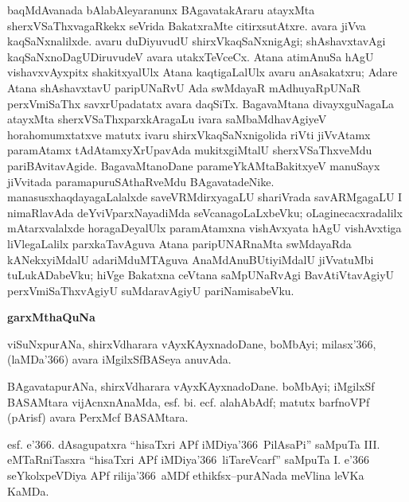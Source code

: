 baqMdAvanada bAlabAleyaranunx BAgavatakAraru atayxMta sherxVSaThxvagaRkekx seVrida BakatxraMte citirxsutAtxre. avara jiVva kaqSaNxnalilxde. avaru duDiyuvudU shirxVkaqSaNxnigAgi; shAshavxtavAgi kaqSaNxnoDagUDiruvudeV avara utakxTeVceCx. Atana atimAnuSa hAgU vishavxvAyxpitx shakitxyalUlx Atana kaqtigaLalUlx avaru anAsakatxru; Adare Atana shAshavxtavU paripUNaRvU Ada swMdayaR mAdhuyaRpUNaR perxVmiSaThx savxrUpadatatx avara daqSiTx. BagavaMtana divayxguNagaLa atayxMta sherxVSaThxparxkAragaLu ivara saMbaMdhavAgiyeV hora\break\-homumxtatxve matutx ivaru shirxVkaqSaNxnigolida riVti jiVvAtamx paramAtamx tAdAtamxyX\-rUpa\-vAda mukitxgiMtalU sherxVSaThxveMdu pariBAvitavAgide. BagavaMtanoDane parameYkAMta\break BakitxyeV manuSayx jiVvitada paramapuruSAthaRveMdu BAgavatadeNike. manasusx\break haqdayagaLalalxde saveVRMdirxyagaLU shariVrada savARMgagaLU I nimaRlavAda deYviV\-parxNayadiMda seVcanagoLaLxbeVku; oLaginecacxradalilx mAtarxvalalxde horagaDeyalUlx para\-mAtamxna vishAvxyata hAgU vishAvxtiga liVlegaLalilx parxkaTavAguva Atana paripUNARnaMta swMdayaRda kANekxyiMdalU adariMduMTAguva AnaMdAnuBUtiyiMdalU jiVvatuMbi tuLukADabeVku; hiVge Bakatxna ceVtana saMpUNaRvAgi BavAtiVtavAgiyU perxVmiSaThxvAgiyU suMdaravAgiyU pariNamisabeVku. 

\theendnotes

\vskip 1cm

\begin{center}
{\bf garxMthaQuNa}
\end{center}

\smallskip
viSuNxpurANa, shirxVdharara vAyxKAyxnadoDane, boMbAyi; milasx\char'366, (laMDa\char'366) avara iMgilxSfBASeya anuvAda.

\smallskip
BAgavatapurANa, shirxVdharara vAyxKAyxnadoDane. boMbAyi; iMgilxSf BASAMtara vijAcnxnAnaMda, esf. bi. ecf. alahAbAdf; matutx barfnoVPf (pArisf) avara PerxMcf BASAMtara.

\smallskip
esf. e\char'366. dAsagupatxra ``hisaTxri APf iMDiya\char'366\ PilAsaPi'' saMpuTa {\rm III.} eMTaRniTasxra ``hisaTxri APf iMDiya\char'366\ liTareVcarf'' saMpuTa {\rm I.} e\char'366 seYkolxpeVDiya APf rilija\char'366\ aMDf ethikfsx--purANada meVlina leVKa KaMDa.
